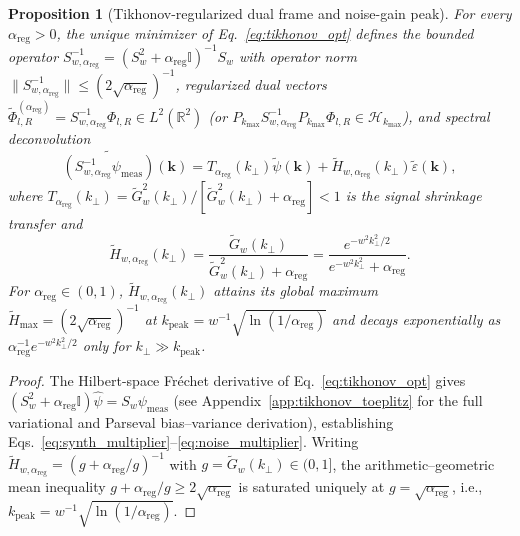 \documentclass[aps,pra,reprint,nofootinbib,floatfix,longbibliography]{revtex4-2}
\newtheorem{proposition}{Proposition}
\theoremstyle{remark}
\newcommand{\norm}[1]{\lVert #1 \rVert}
\begin{document}
\begin{proposition}[Tikhonov-regularized dual frame and noise-gain peak]
\label{prop:tikhonov_dual}
For every $\alpha_{\mathrm{reg}} > 0$, the unique minimizer of Eq.~\eqref{eq:tikhonov_opt} defines the bounded operator $S_{w,\alpha_{\mathrm{reg}}}^{-1} = (S_w^2 + \alpha_{\mathrm{reg}}\mathbb{I})^{-1}S_w$ with operator norm $\norm{S_{w,\alpha_{\mathrm{reg}}}^{-1}} \le (2\sqrt{\alpha_{\mathrm{reg}}})^{-1}$, regularized dual vectors $\widetilde{\Phi}_{l,R}^{(\alpha_{\mathrm{reg}})} = S_{w,\alpha_{\mathrm{reg}}}^{-1}\Phi_{l,R} \in L^2(\mathbb{R}^2)$ (or $P_{k_{\max}}S_{w,\alpha_{\mathrm{reg}}}^{-1}P_{k_{\max}}\Phi_{l,R} \in \mathcal{H}_{k_{\max}}$), and spectral deconvolution
\begin{equation}
\widetilde{(S_{w,\alpha_{\mathrm{reg}}}^{-1}\psi_{\mathrm{meas}})}(\mathbf{k}) = T_{\alpha_{\mathrm{reg}}}(k_\perp)\widetilde{\psi}(\mathbf{k}) + \widetilde{H}_{w,\alpha_{\mathrm{reg}}}(k_\perp)\widetilde{\varepsilon}(\mathbf{k}),
\label{eq:synth_multiplier}
\end{equation}
where $T_{\alpha_{\mathrm{reg}}}(k_\perp) = \widetilde{G}_w^2(k_\perp)/[\widetilde{G}_w^2(k_\perp) + \alpha_{\mathrm{reg}}] < 1$ is the signal shrinkage transfer and
\begin{equation}
\widetilde{H}_{w,\alpha_{\mathrm{reg}}}(k_\perp) = \frac{\widetilde{G}_w(k_\perp)}{\widetilde{G}_w^2(k_\perp) + \alpha_{\mathrm{reg}}} = \frac{e^{-w^2 k_\perp^2/2}}{e^{-w^2 k_\perp^2} + \alpha_{\mathrm{reg}}}.
\label{eq:noise_multiplier}
\end{equation}
For $\alpha_{\mathrm{reg}} \in (0,1)$, $\widetilde{H}_{w,\alpha_{\mathrm{reg}}}(k_\perp)$ attains its global maximum $\widetilde{H}_{\max} = (2\sqrt{\alpha_{\mathrm{reg}}})^{-1}$ at $k_{\mathrm{peak}} = w^{-1}\sqrt{\ln(1/\alpha_{\mathrm{reg}})}$ and decays exponentially as $\alpha_{\mathrm{reg}}^{-1} e^{-w^2 k_\perp^2/2}$ only for $k_\perp \gg k_{\mathrm{peak}}$.
\end{proposition}
\begin{proof}
The Hilbert-space Fr\'echet derivative of Eq.~\eqref{eq:tikhonov_opt} gives $(S_w^2 + \alpha_{\mathrm{reg}}\mathbb{I})\hat{\psi} = S_w\psi_{\mathrm{meas}}$ (see Appendix~\ref{app:tikhonov_toeplitz} for the full variational and Parseval bias--variance derivation), establishing Eqs.~\eqref{eq:synth_multiplier}--\eqref{eq:noise_multiplier}. Writing $\widetilde{H}_{w,\alpha_{\mathrm{reg}}} = (g + \alpha_{\mathrm{reg}}/g)^{-1}$ with $g = \widetilde{G}_w(k_\perp) \in (0,1]$, the arithmetic--geometric mean inequality $g + \alpha_{\mathrm{reg}}/g \ge 2\sqrt{\alpha_{\mathrm{reg}}}$ is saturated uniquely at $g = \sqrt{\alpha_{\mathrm{reg}}}$, i.e., $k_{\mathrm{peak}} = w^{-1}\sqrt{\ln(1/\alpha_{\mathrm{reg}})}$.
\end{proof}
\end{document}
